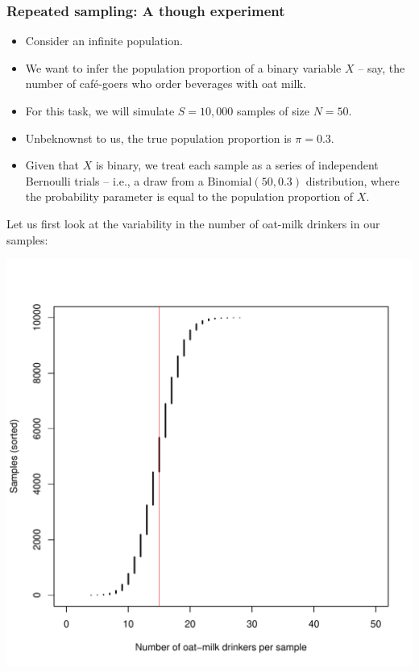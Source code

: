 \documentclass[
  11pt,
]{article}
\providecommand{\tightlist}{%
  \setlength{\itemsep}{0pt}\setlength{\parskip}{0pt}}
\begin{document}
\hypertarget{repeated-sampling-a-though-experiment}{%
\subsubsection{Repeated sampling: A though experiment}\label{repeated-sampling-a-though-experiment}}

\begin{itemize}
\tightlist
\item
  Consider an infinite population.
\item
  We want to infer the population proportion of a binary variable \(X\) -- say, the number of café-goers who order beverages with oat milk.
\item
  For this task, we will simulate \(S=10,000\) samples of size \(N = 50\).
\item
  Unbeknownst to us, the true population proportion is \(\pi = 0.3\).
\item
  Given that \(X\) is binary, we treat each sample as a series of independent Bernoulli trials -- i.e., a draw from a \(\text{Binomial}(50, 0.3)\) distribution, where the probability parameter is equal to the population proportion of \(X\).
\end{itemize}

Let us first look at the variability in the number of oat-milk drinkers in our samples:

\begin{center}\includegraphics{01-01-lec_files/figure-latex/sim-data-1} \end{center}
\end{document}
